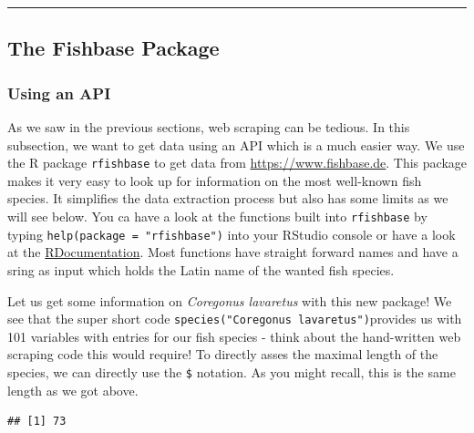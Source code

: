 \documentclass[
]{book}
\newenvironment{Shaded}{\begin{snugshade}}{\end{snugshade}}
\newcommand{\KeywordTok}[1]{\textcolor[rgb]{0.13,0.29,0.53}{\textbf{#1}}}
\newcommand{\NormalTok}[1]{#1}
\newcommand{\OperatorTok}[1]{\textcolor[rgb]{0.81,0.36,0.00}{\textbf{#1}}}
\newcommand{\StringTok}[1]{\textcolor[rgb]{0.31,0.60,0.02}{#1}}
\begin{document}
\begin{center}\rule{0.5\linewidth}{0.5pt}\end{center}

\hypertarget{the-fishbase-package}{%
\subsection{The Fishbase Package}\label{the-fishbase-package}}

\hypertarget{using-an-api}{%
\subsubsection*{Using an API}\label{using-an-api}}

As we saw in the previous sections, web scraping can be tedious. In this subsection, we want to get data using an API which is a much easier way. We use the R package \texttt{rfishbase} to get data from \url{https://www.fishbase.de}. This package makes it very easy to look up for information on the most well-known fish species. It simplifies the data extraction process but also has some limits as we will see below. You ca have a look at the functions built into \texttt{rfishbase} by typing \texttt{help(package\ =\ "rfishbase")} into your RStudio console or have a look at the \href{https://www.rdocumentation.org/packages/rfishbase/versions/3.0.4}{RDocumentation}. Most functions have straight forward names and have a sring as input which holds the Latin name of the wanted fish species.

Let us get some information on \emph{Coregonus lavaretus} with this new package! We see that the super short code \texttt{species("Coregonus\ lavaretus")}provides us with 101 variables with entries for our fish species - think about the hand-written web scraping code this would require! To directly asses the maximal length of the species, we can directly use the \texttt{\$} notation. As you might recall, this is the same length as we got above.

\begin{Shaded}
\end{Shaded}

\begin{verbatim}
## [1] 73
\end{verbatim}
\end{document}
